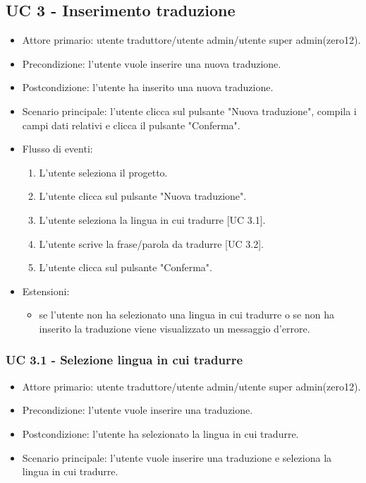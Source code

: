 \subsection{UC 3 - Inserimento traduzione}
    \begin{itemize}
        \item Attore primario: utente traduttore/utente admin/utente super admin(zero12).
        \item Precondizione: l'utente vuole inserire una nuova traduzione.
        \item Postcondizione: l'utente ha inserito una nuova traduzione.
        \item Scenario principale: l'utente clicca sul pulsante "Nuova traduzione", compila i campi dati relativi e clicca il pulsante "Conferma".
        \item Flusso di eventi:
            \begin{enumerate}
                \item L'utente seleziona il progetto.
                \item L'utente clicca sul pulsante "Nuova traduzione".
                \item L'utente seleziona la lingua in cui tradurre [UC 3.1].
                \item L'utente scrive la frase/parola da tradurre [UC 3.2].
                \item L'utente clicca sul pulsante "Conferma".
            \end{enumerate}
        \item Estensioni:
        \begin{itemize}
            \item se l'utente non ha selezionato una lingua in cui tradurre o se non ha inserito la traduzione viene visualizzato un messaggio d'errore.
        \end{itemize}
    \end{itemize}
    \subsubsection{UC 3.1 - Selezione lingua in cui tradurre}
        \begin{itemize}
            \item Attore primario: utente traduttore/utente admin/utente super admin(zero12).
            \item Precondizione: l'utente vuole inserire una traduzione.
            \item Postcondizione: l'utente ha selezionato la lingua in cui tradurre.
            \item Scenario principale: l'utente vuole inserire una traduzione e seleziona la lingua in cui tradurre.
        \end{itemize}
